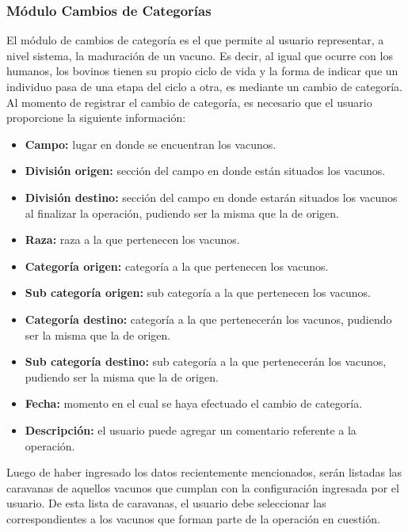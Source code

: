 \documentclass[11pt,oneside]{book}
\begin{document}
\subsubsection{Módulo Cambios de Categorías}
El módulo de cambios de categoría es el que permite al usuario representar, a nivel sistema, la maduración de un vacuno. Es decir, al igual que ocurre con los humanos, los bovinos tienen su propio ciclo de vida y la forma de indicar que un individuo pasa de una etapa del ciclo a otra, es mediante un cambio de categoría. Al momento de registrar el cambio de categoría, es necesario que el usuario proporcione la siguiente información: 
\begin{itemize}
\item \textbf{Campo:} lugar en donde se encuentran los vacunos.
\item \textbf{División origen:} sección del campo en donde están situados los vacunos.
\item \textbf{División destino:} sección del campo en donde estarán situados los vacunos al finalizar la operación, pudiendo ser la misma que la de origen.
\item \textbf{Raza:} raza a la que pertenecen los vacunos.
\item \textbf{Categoría origen:} categoría a la que pertenecen los vacunos.
\item \textbf{Sub categoría origen:} sub categoría a la que pertenecen los vacunos.
\item \textbf{Categoría destino:} categoría a la que pertenecerán los vacunos, pudiendo ser la misma que la de origen.
\item \textbf{Sub categoría destino:} sub categoría a la que pertenecerán los vacunos, pudiendo ser la misma que la de origen.
\item \textbf{Fecha:} momento en el cual se haya efectuado el cambio de categoría.
\item \textbf{Descripción:} el usuario puede agregar un comentario referente a la operación.
\end{itemize}

Luego de haber ingresado los datos recientemente mencionados, serán listadas las caravanas de aquellos vacunos que cumplan con la configuración ingresada por el usuario. De esta lista de caravanas, el usuario debe seleccionar las correspondientes a los vacunos que forman parte de la operación en cuestión.
\end{document}
